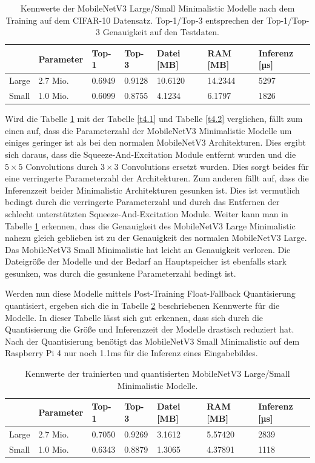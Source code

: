 \begin{table}[ht]
\centering
\begin{tabular}{lllllll}
\toprule
 & Parameter &  Top-1 &  Top-3 &  Datei [MB] &  RAM [MB] &  Inferenz [µs] \\
\midrule
            Large &  2.7 Mio. & 0.6949 & 0.9128 &     10.6120 &   14.2344 &        5297 \\
            Small &  1.0 Mio. & 0.6099 & 0.8755 &      4.1234 &    6.1797 &        1826 \\
\bottomrule
\end{tabular}
\caption{Kennwerte der MobileNetV3 Large/Small Minimalistic Modelle nach dem Training auf dem CIFAR-10 Datensatz. Top-1/Top-3 entsprechen der Top-1/Top-3 Genauigkeit auf den Testdaten.}
\label{t4.7}
\end{table}

Wird die Tabelle \ref{t4.7} mit der Tabelle \ref{t4.1} und Tabelle \ref{t4.2} verglichen, fällt zum einen auf, dass die Parameterzahl der MobileNetV3 Minimalistic Modelle um einiges geringer ist als bei den normalen MobileNetV3 Architekturen. Dies ergibt sich daraus, dass die Squeeze-And-Excitation Module entfernt wurden und die $5 \times 5$ Convolutions durch $3 \times 3$ Convolutions ersetzt wurden. Dies sorgt beides für eine verringerte Parameterzahl der Architekturen. Zum anderen fällt auf, dass die Inferenzzeit beider Minimalistic Architekturen gesunken ist. Dies ist vermutlich bedingt durch die verringerte Parameterzahl und durch das Entfernen der schlecht unterstützten Squeeze-And-Excitation Module. Weiter kann man in Tabelle \ref{t4.7} erkennen, dass die Genauigkeit des MobileNetV3 Large Minimalistic nahezu gleich geblieben ist zu der Genauigkeit des normalen MobileNetV3 Large. Das MobileNetV3 Small Minimalistic hat leicht an Genauigkeit verloren. Die Dateigröße der Modelle und der Bedarf an Hauptspeicher ist ebenfalls stark gesunken, was durch die gesunkene Parameterzahl bedingt ist.

Werden nun diese Modelle mittels Post-Training Float-Fallback Quantisierung quantisiert, ergeben sich die in Tabelle \ref{t4.8} beschriebenen Kennwerte für die Modelle. In dieser Tabelle lässt sich gut erkennen, dass sich durch die Quantisierung die Größe und Inferenzzeit der Modelle drastisch reduziert hat. Nach der Quantisierung benötigt das MobileNetV3 Small Minimalistic auf dem Raspberry Pi 4 nur noch 1.1ms für die Inferenz eines Eingabebildes.

\begin{table}[ht]
\centering
\begin{tabular}{lllllll}
\toprule
 & Parameter &  Top-1 &  Top-3 &  Datei [MB] &  RAM [MB] &  Inferenz [µs] \\
\midrule
            Large &  2.7 Mio. & 0.7050 & 0.9269 &      3.1612 &   5.57420 &        2839 \\
            Small &  1.0 Mio. & 0.6343 & 0.8879 &      1.3065 &   4.37891 &        1118 \\
\bottomrule
\end{tabular}
\caption{Kennwerte der trainierten und quantisierten MobileNetV3 Large/Small Minimalistic Modelle.}
\label{t4.8}
\end{table}

